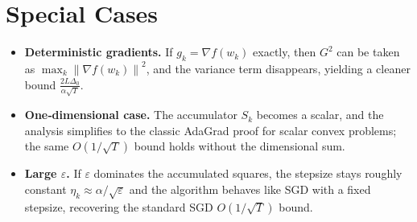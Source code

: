 \documentclass{article}
\newcommand{\norm}[1]{\left\|#1\right\|}
\begin{document}
\section*{Special Cases}
\begin{itemize}[leftmargin=*]
\item \textbf{Deterministic gradients.} If $g_{k}=\nabla f(w_{k})$ exactly, then $G^{2}$ can be taken as $\max_{k}\norm{\nabla f(w_{k})}^{2}$, and the variance term disappears, yielding a cleaner bound $\frac{2L\Delta_{0}}{\alpha\sqrt{T}}$.
\item \textbf{One‑dimensional case.} The accumulator $S_{k}$ becomes a scalar, and the analysis simplifies to the classic AdaGrad proof for scalar convex problems; the same $O(1/\sqrt{T})$ bound holds without the dimensional sum.
\item \textbf{Large $\varepsilon$.} If $\varepsilon$ dominates the accumulated squares, the stepsize stays roughly constant $\eta_{k}\approx \alpha/\sqrt{\varepsilon}$ and the algorithm behaves like SGD with a fixed stepsize, recovering the standard SGD $O(1/\sqrt{T})$ bound.
\end{itemize}
\end{document}
